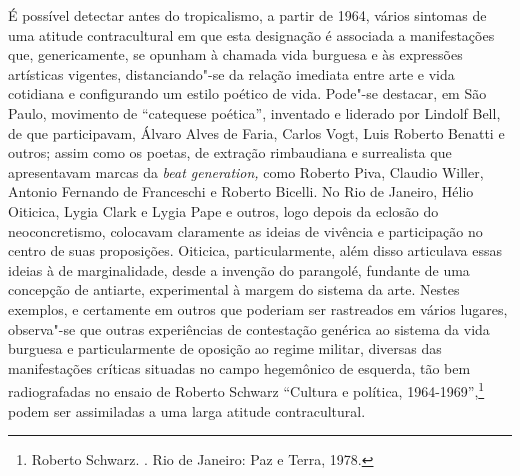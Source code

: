 \asterisc

É possível detectar antes do tropicalismo, a partir de 1964, vários
sintomas de uma atitude contracultural em que esta designação é
associada a manifestações que, genericamente, se opunham à chamada vida
burguesa e às expressões artísticas vigentes, distanciando"-se da relação
imediata entre arte e vida cotidiana e configurando um estilo poético de
vida. Pode"-se destacar, em São Paulo, movimento de ``catequese
poética'', inventado e liderado por Lindolf Bell, de que participavam,
Álvaro Alves de Faria, Carlos Vogt, Luis Roberto Benatti e outros; assim
como os poetas, de extração rimbaudiana e surrealista que apresentavam
marcas da \emph{beat generation,} como Roberto Piva, Claudio Willer,
Antonio Fernando de Franceschi e Roberto Bicelli. No Rio de Janeiro,
Hélio Oiticica, Lygia Clark e Lygia Pape e outros, logo depois da
eclosão do neoconcretismo, colocavam claramente as ideias de vivência e
participação no centro de suas proposições. Oiticica, particularmente,
além disso articulava essas ideias à de marginalidade, desde a invenção
do parangolé, fundante de uma concepção de antiarte, experimental à
margem do sistema da arte. Nestes exemplos, e certamente em outros que
poderiam ser rastreados em vários lugares, observa"-se que outras
experiências de contestação genérica ao sistema da vida burguesa e
particularmente de oposição ao regime militar, diversas das
manifestações críticas situadas no campo hegemônico de esquerda, tão bem
radiografadas no ensaio de Roberto Schwarz ``Cultura e política,
1964-1969'',\footnote{Roberto Schwarz. {}. Rio de Janeiro: Paz e Terra, 1978.} podem ser assimiladas a
uma larga atitude contracultural.

